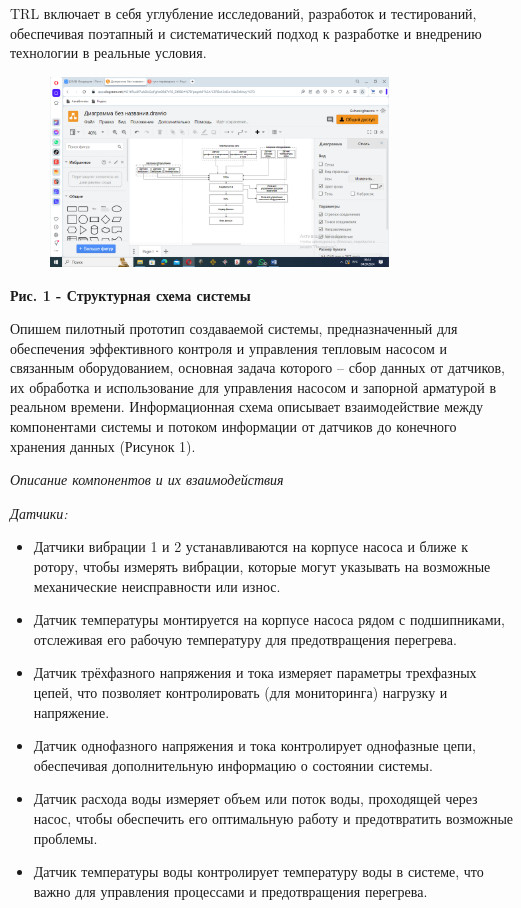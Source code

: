 TRL включает в себя углубление исследований, разработок и тестирований,
обеспечивая поэтапный и систематический подход к разработке и внедрению
технологии в реальные условия.

\begin{figure}[H]
	\centering
	\includegraphics[width=0.8\textwidth]{assets/148}
	\caption*{}
\end{figure}

{\bfseries Рис. 1 - Структурная схема системы}

Опишем пилотный прототип создаваемой системы, предназначенный для
обеспечения эффективного контроля и управления тепловым насосом и
связанным оборудованием, основная задача которого -- сбор данных от
датчиков, их обработка и использование для управления насосом и запорной
арматурой в реальном времени. Информационная схема описывает
взаимодействие между компонентами системы и потоком информации от
датчиков до конечного хранения данных (Рисунок 1).

\emph{Описание компонентов и их взаимодействия}

\emph{Датчики:}

\begin{itemize}
\item
  Датчики вибрации 1 и 2 устанавливаются на корпусе насоса и ближе к
  ротору, чтобы измерять вибрации, которые могут указывать на возможные
  механические неисправности или износ.
\item
  Датчик температуры монтируется на корпусе насоса рядом с подшипниками,
  отслеживая его рабочую температуру для предотвращения перегрева.
\item
  Датчик трёхфазного напряжения и тока измеряет параметры трехфазных
  цепей, что позволяет контролировать (для мониторинга) нагрузку и
  напряжение.
\item
  Датчик однофазного напряжения и тока контролирует однофазные цепи,
  обеспечивая дополнительную информацию о состоянии системы.
\item
  Датчик расхода воды измеряет объем или поток воды, проходящей через
  насос, чтобы обеспечить его оптимальную работу и предотвратить
  возможные проблемы.
\item
  Датчик температуры воды контролирует температуру воды в системе, что
  важно для управления процессами и предотвращения перегрева.
\end{itemize}

